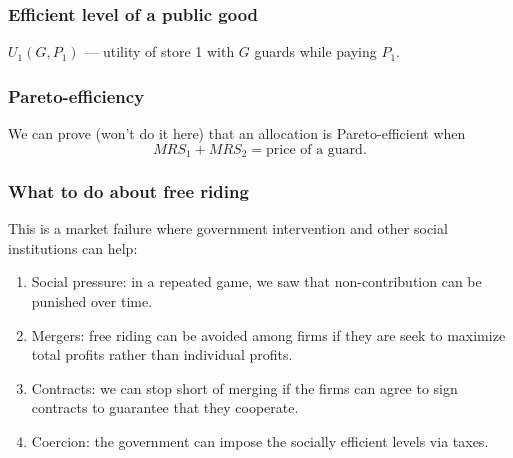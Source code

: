 \documentclass[xcolor=pdftex,dvipsnames]{beamer}
\begin{document}
\begin{frame}
  \frametitle{Efficient level of a public good}
  $U_1(G, P_1)$ --- utility of store 1 with $G$ guards while paying 
  $P_1$.\bigskip



\bigskip


\end{frame}
\begin{frame}
  \frametitle{Pareto-efficiency}
We can prove (won't do it here) that an allocation is
Pareto-efficient when 
\[
MRS_1 + MRS_2 = \text{price of a guard.}
\]

\bigskip
{}

\bigskip



\end{frame}


\begin{frame}
  \frametitle{What to do about free riding}
  This is a market failure where government intervention and other
  social institutions can help:
  \begin{enumerate}
  \item<2-> Social pressure: in a repeated game, we saw that
    non-contribution can be punished over time.
  \item<3-> Mergers: free riding can be avoided among firms if they
    are seek to maximize total profits rather than individual profits.
  \item<4-> Contracts: we can stop short of merging if the firms can
    agree to sign contracts to guarantee that they cooperate.
  \item<5-> Coercion: the government can impose the socially efficient
    levels via taxes.
  \end{enumerate}
\end{frame}
\end{document}
